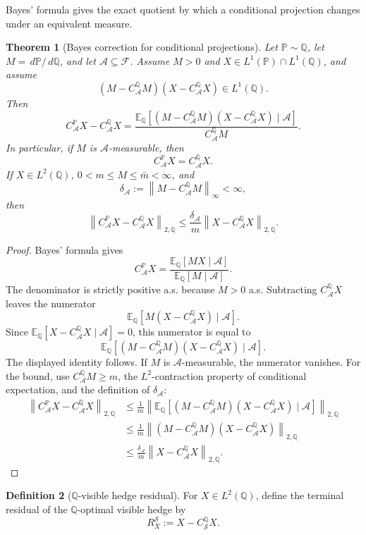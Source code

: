 \documentclass[11pt,a4paper]{amsart}
\theoremstyle{plain}
\newtheorem{theorem}{Theorem}[section]
\theoremstyle{definition}
\newtheorem{definition}[theorem]{Definition}
\theoremstyle{remark}
\newcommand{\PP}{\mathbb{P}}
\newcommand{\QQ}{\mathbb{Q}}
\newcommand{\EE}{\mathbb{E}}
\newcommand{\cA}{\mathcal{A}}
\newcommand{\cF}{\mathcal{F}}
\newcommand{\cS}{\mathcal{S}}
\newcommand{\dd}{\,d}
\newcommand{\norm}[1]{\left\lVert #1\right\rVert}
\begin{document}
Bayes' formula gives the exact quotient by which a conditional projection changes under an
equivalent measure.

\begin{theorem}[Bayes correction for conditional projections]\label{thm:bayes-projection-correction}
Let \(\PP\sim\QQ\), let \(M=\dd\PP/\dd\QQ\), and let \(\cA\subseteq\cF\).  Assume \(M>0\) and
\(X\in L^1(\PP)\cap L^1(\QQ)\), and assume
\[
        (M-C_{\cA}^{\QQ}M)(X-C_{\cA}^{\QQ}X)\in L^1(\QQ).
\]
Then
\[
        C_{\cA}^{\PP}X-C_{\cA}^{\QQ}X
        =
        \frac{
        \EE_\QQ\!\left[
        (M-C_{\cA}^{\QQ}M)(X-C_{\cA}^{\QQ}X)
        \mid\cA
        \right]}
        {C_{\cA}^{\QQ}M}.
\]
In particular, if \(M\) is \(\cA\)-measurable, then
\[
        C_{\cA}^{\PP}X=C_{\cA}^{\QQ}X.
\]
If \(X\in L^2(\QQ)\), \(0<m\le M\le\bar m<\infty\), and
\[
        \delta_{\cA}:=\norm{M-C_{\cA}^{\QQ}M}_\infty<\infty,
\]
then
\[
        \norm{C_{\cA}^{\PP}X-C_{\cA}^{\QQ}X}_{2,\QQ}
        \le
        \frac{\delta_{\cA}}{m}
        \norm{X-C_{\cA}^{\QQ}X}_{2,\QQ}.
\]
\end{theorem}

\begin{proof}
Bayes' formula gives
\[
        C_{\cA}^{\PP}X
        =
        \frac{\EE_\QQ[MX\mid\cA]}{\EE_\QQ[M\mid\cA]}.
\]
The denominator is strictly positive a.s. because \(M>0\) a.s.  Subtracting
\(C_{\cA}^{\QQ}X\) leaves the numerator
\[
        \EE_\QQ[M(X-C_{\cA}^{\QQ}X)\mid\cA].
\]
Since \(\EE_\QQ[X-C_{\cA}^{\QQ}X\mid\cA]=0\), this numerator is equal to
\[
        \EE_\QQ[(M-C_{\cA}^{\QQ}M)(X-C_{\cA}^{\QQ}X)\mid\cA].
\]
The displayed identity follows.  If \(M\) is \(\cA\)-measurable, the numerator vanishes.  For the
bound, use \(C_{\cA}^{\QQ}M\ge m\), the \(L^2\)-contraction property of conditional expectation,
and the definition of \(\delta_{\cA}\):
\[
\begin{aligned}
        \norm{C_{\cA}^{\PP}X-C_{\cA}^{\QQ}X}_{2,\QQ}
        &\le
        \frac1m
        \norm{\EE_\QQ[(M-C_{\cA}^{\QQ}M)(X-C_{\cA}^{\QQ}X)\mid\cA]}_{2,\QQ} \\
        &\le
        \frac1m
        \norm{(M-C_{\cA}^{\QQ}M)(X-C_{\cA}^{\QQ}X)}_{2,\QQ} \\
        &\le
        \frac{\delta_{\cA}}{m}
        \norm{X-C_{\cA}^{\QQ}X}_{2,\QQ}.
\end{aligned}
\]
\end{proof}

\begin{definition}[\(\QQ\)-visible hedge residual]\label{def:q-visible-hedge-residual}
For \(X\in L^2(\QQ)\), define the terminal residual of the \(\QQ\)-optimal visible hedge by
\[
        R_X^{\cS}
        :=
        X-C_{\cS}^{\QQ}X.
\]
\end{definition}
\end{document}
